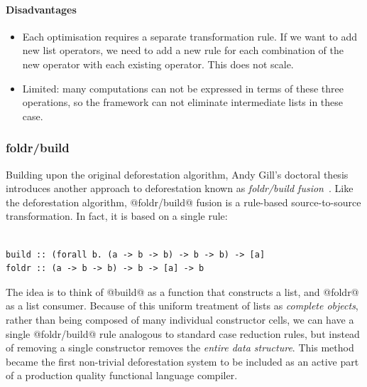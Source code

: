 \paragraph{Disadvantages}
\begin{itemize}
    \item Each optimisation requires a separate transformation rule. If we want
        to add new list operators, we need to add a new rule for each
        combination of the new operator with each existing operator. This does
        not scale.

    \item Limited: many computations can not be expressed in terms of these
        three operations, so the framework can not eliminate intermediate lists
        in these case.
\end{itemize}


\subsubsection{foldr/build}

Building upon the original deforestation algorithm, Andy Gill's doctoral thesis
introduces another approach to deforestation known as \emph{foldr/build
fusion}~\cite{Gill:1996tf,Gill:1993de}.
Like the deforestation algorithm, @foldr/build@ fusion is a rule-based
source-to-source transformation. In fact, it is based on a single rule:
%
\begin{lstlisting}[style=Haskell,numbers=none,mathescape,caption={The @foldr/build@ transformation}]
%\bf$\langle$ foldr/build fusion $\rangle$% forall g k z. foldr k z (build g) $\mapsto$ g k z

build :: (forall b. (a -> b -> b) -> b -> b) -> [a]
foldr :: (a -> b -> b) -> b -> [a] -> b
\end{lstlisting}

The idea is to think of @build@ as a function that constructs a list, and
@foldr@ as a list consumer. Because of this uniform treatment of lists as
\emph{complete objects}, rather than being composed of many individual
constructor cells, we can have a single @foldr/build@ rule analogous to
standard case reduction rules, but instead of removing a single constructor
removes the \emph{entire data structure}. This method became the first
non-trivial deforestation system to be included as an active part of a
production quality functional language compiler.

